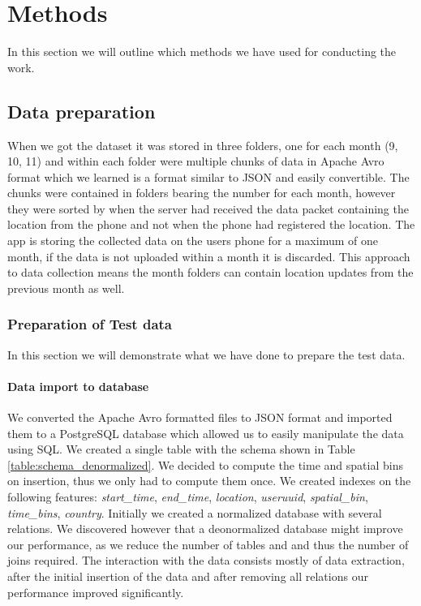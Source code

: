 \chapter{Methods}
\label{chap:methods}

In this section we will outline which methods we have used for conducting the work.
\section{Data preparation}

When we got the dataset it was stored in three folders, one for each month (9, 10, 11) and within each folder were multiple chunks of data in Apache Avro format\cite{apacheavro} which we learned is a format similar to JSON and easily convertible. The chunks were contained in folders bearing the number for each month, however they were sorted by when the server had received the data packet containing the location from the phone and not when the phone had registered the location. The app is storing the collected data on the users phone for a maximum of one month, if the data is not uploaded within a month it is discarded. This approach to data collection means the month folders can contain location updates from the previous month as well.

\subsection{Preparation of Test data}
In this section we will demonstrate what we have done to prepare the test data.

\subsubsection{Data import to database}
We converted the Apache Avro formatted files to JSON format and imported them to a PostgreSQL database which allowed us to easily manipulate the data using SQL. We created a single table with the schema shown in Table \ref{table:schema_denormalized}. We decided to compute the time and spatial bins on insertion, thus we only had to compute them once. We created indexes on the following features: \textit{start\_time}, \textit{end\_time}, \textit{location}, \textit{useruuid}, \textit{spatial\_bin}, \textit{time\_bins}, \textit{country}.
Initially we created a normalized database with several relations. We discovered however that a deonormalized database might improve our performance, as we reduce the number of tables and and thus the number of joins required\cite{sanders2001denormalization}. The interaction with the data consists mostly of data extraction, after the initial insertion of the data and after removing all relations our performance improved significantly.

